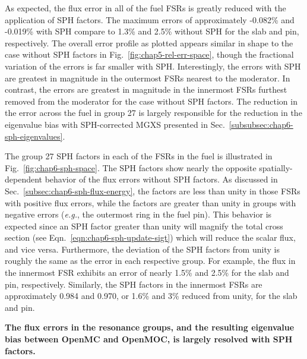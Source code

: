 As expected, the flux error in all of the fuel \ac{FSR}s is greatly reduced with the application of \ac{SPH} factors. The maximum errors of approximately -0.082\% and -0.019\% with \ac{SPH} compare to 1.3\% and 2.5\% without \ac{SPH} for the slab and pin, respectively. The overall error profile as plotted appears similar in shape to the case without \ac{SPH} factors in Fig.~\ref{fig:chap5-rel-err-space}, though the fractional variation of the errors is far smaller with \ac{SPH}. Interestingly, the errors with \ac{SPH} are greatest in magnitude in the outermost \ac{FSR}s nearest to the moderator. In contrast, the errors are greatest in magnitude in the innermost \ac{FSR}s furthest removed from the moderator for the case without \ac{SPH} factors. The reduction in the error across the fuel in group 27 is largely responsible for the reduction in the eigenvalue bias with \ac{SPH}-corrected \ac{MGXS} presented in Sec.~\ref{subsubsec:chap6-sph-eigenvalues}.

The group 27 \ac{SPH} factors in each of the \ac{FSR}s in the fuel is illustrated in Fig.~\ref{fig:chap6-sph-space}. The \ac{SPH} factors show nearly the opposite spatially-dependent behavior of the flux errors without \ac{SPH} factors. As discussed in Sec.~\ref{subsec:chap6-sph-flux-energy}, the factors are less than unity in those \ac{FSR}s with positive flux errors, while the factors are greater than unity in groups with negative errors (\textit{e.g.}, the outermost ring in the fuel pin). This behavior is expected since an \ac{SPH} factor greater than unity will magnify the total cross section (see Eqn.~\ref{eqn:chap6-sph-update-sigt}) which will reduce the scalar flux, and vice versa. Furthermore, the deviation of the \ac{SPH} factors from unity is roughly the same as the error in each respective group. For example, the flux in the innermost \ac{FSR} exhibits an error of nearly 1.5\% and 2.5\% for the slab and pin, respectively. Similarly, the \ac{SPH} factors in the innermost \ac{FSR}s are approximately 0.984 and 0.970, or 1.6\% and 3\% reduced from unity, for the slab and pin.

\begin{emphbox}
\textbf{The flux errors in the resonance groups, and the resulting eigenvalue bias between OpenMC and OpenMOC, is largely resolved with \ac{SPH} factors.}
\end{emphbox}


